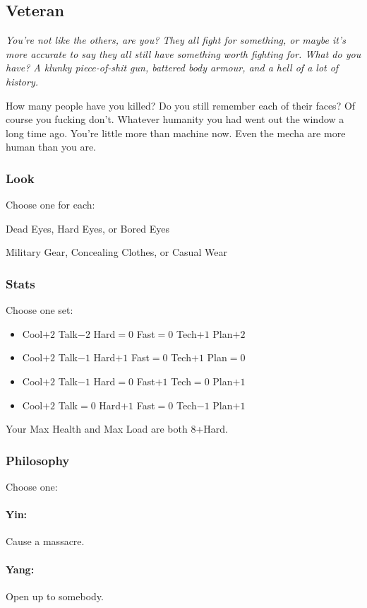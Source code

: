 
\subsection{Veteran}
{\itshape You're not like the others, are you? They all fight for
  something, or maybe it's more accurate to say they all still have
  something worth fighting for. What do you have? A klunky
  piece-of-shit gun, battered body armour, and a hell of a lot of
  history.

How many people have you killed? Do you still remember each of their
faces? Of course you fucking don't. Whatever humanity you had went out
the window a long time ago. You're little more than machine now. Even
the mecha are more human than you are.}

\subsubsection{Look}

Choose one for each:

Dead Eyes, Hard Eyes, or Bored Eyes

Military Gear, Concealing Clothes, or Casual Wear

\subsubsection{Stats}
Choose one set:
\begin{itemize}
\setlength\itemsep{0em}
\item Cool$+2$ Talk$-2$ Hard${=}0$ Fast${=}0$ Tech$+1$ Plan$+2$
\item Cool$+2$ Talk$-1$ Hard$+1$ Fast${=}0$ Tech$+1$ Plan${=}0$
\item Cool$+2$ Talk$-1$ Hard${=}0$ Fast$+1$ Tech${=}0$ Plan$+1$
\item Cool$+2$ Talk${=}0$ Hard$+1$ Fast${=}0$ Tech$-1$ Plan$+1$
\end{itemize}

Your Max Health and Max Load are both 8+Hard.

\subsubsection{Philosophy}
Choose one:
\paragraph{Yin:} Cause a massacre.
\paragraph{Yang:} Open up to somebody.

